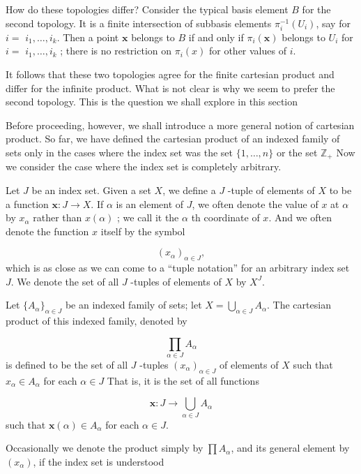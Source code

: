How do these topologies differ? Consider the typical basis element \(B\) for the second topology. It is a finite intersection of subbasis elements \({\pi }_i^{-1}( U_{i})\), say for \(i =\) \(i_{1},\ldots,i_{k}\). Then a point \(\mathbf{x}\) belongs to \(B\) if and only if \({\pi }_{i}( \mathbf{x})\) belongs to \(U_{i}\) for \(i =\) \(i_{1},\ldots,i_{k}\) ; there is no restriction on \({\pi }_{i}(x)\) for other values of \(i\).

It follows that these two topologies agree for the finite cartesian product and differ for the infinite product. What is not clear is why we seem to prefer the second topology. This is the question we shall explore in this section

Before proceeding, however, we shall introduce a more general notion of cartesian product. So far, we have defined the cartesian product of an indexed family of sets only in the cases where the index set was the set \(\{ 1,\ldots,n\}\) or the set \(\mathbb{Z}_{ + }\) Now we consider the case where the index set is completely arbitrary.

\begin{definition}
 Let \(J\) be an index set. Given a set \(X\), we define a \(J\) -tuple of elements of \(X\) to be a function \(\mathbf{x} : J \rightarrow X\). If \(\alpha\) is an element of \(J\), we often denote the value of \(x\) at \(\alpha\) by \(x_{\alpha }\) rather than \(x( \alpha )\) ; we call it the \(\alpha\) th coordinate of \(x\). And we often denote the function \(x\) itself by the symbol

 \[
 {( x_{\alpha }) }_{\alpha \in J},
 \]
 which is as close as we can come to a ``tuple notation'' for an arbitrary index set \(J\). We denote the set of all \(J\) -tuples of elements of \(X\) by \( X^{J}\).
\end{definition}

\begin{definition}
 Let \({\{ A_{\alpha }\} }_{\alpha \in J}\) be an indexed family of sets; let \(X = \mathop{\bigcup }\limits_{{\alpha \in J}}A_{\alpha }\). The cartesian product of this indexed family, denoted by

 \[
 \mathop{\prod }\limits_{{\alpha \in J}}A_{\alpha }
 \]
 is defined to be the set of all \(J\) -tuples \({( x_{\alpha }) }_{\alpha \in J}\) of elements of \(X\) such that \(x_{\alpha } \in {A}_{\alpha }\) for each \(\alpha \in J\) That is, it is the set of all functions

 \[
 \mathbf{x} : J \rightarrow \mathop{\bigcup }\limits_{{\alpha \in J}}A_{\alpha }
 \]
 such that \(\mathbf{x}( \alpha ) \in {A}_{\alpha }\) for each \(\alpha \in J\).

 Occasionally we denote the product simply by \(\prod {A}_{\alpha }\), and its general element by \(( x_{\alpha })\), if the index set is understood
\end{definition}

